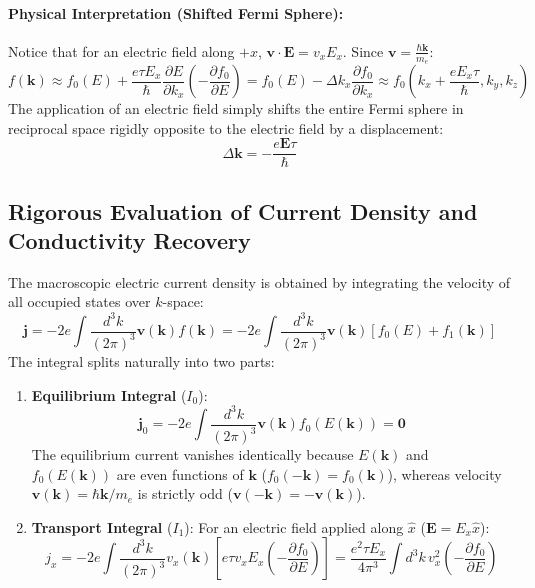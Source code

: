 \documentclass[11pt,a4paper]{article}
\newcommand{\vb}[1]{\mathbf{#1}}
\begin{document}
\paragraph{Physical Interpretation (Shifted Fermi Sphere):}
Notice that for an electric field along $+x$, $\vb{v}\cdot\vb{E} = v_x E_x$. Since $\vb{v} = \frac{\hbar\vb{k}}{m_e}$:
\begin{equation}
f(\vb{k}) \approx f_0(E) + \frac{e\tau E_x}{\hbar}\frac{\partial E}{\partial k_x}\left(-\frac{\partial f_0}{\partial E}\right) = f_0(E) - \Delta k_x \frac{\partial f_0}{\partial k_x} \approx f_0\left(k_x + \frac{e E_x \tau}{\hbar}, k_y, k_z\right)
\end{equation}
The application of an electric field simply shifts the entire Fermi sphere in reciprocal space rigidly opposite to the electric field by a displacement:
\begin{equation}
\boxed{\Delta\vb{k} = -\frac{e\vb{E}\tau}{\hbar}}
\label{eq:k_shift}
\end{equation}

\subsection{Rigorous Evaluation of Current Density and Conductivity Recovery}
The macroscopic electric current density is obtained by integrating the velocity of all occupied states over $k$-space:
\begin{equation}
\vb{j} = -2e\int \frac{d^3k}{(2\pi)^3}\vb{v}(\vb{k}) f(\vb{k}) = -2e\int \frac{d^3k}{(2\pi)^3}\vb{v}(\vb{k})\left[ f_0(E) + f_1(\vb{k}) \right]
\label{eq:j_integral_split}
\end{equation}
The integral splits naturally into two parts:
\begin{enumerate}
    \item \textbf{Equilibrium Integral} ($I_0$):
    \begin{equation}
    \vb{j}_0 = -2e\int \frac{d^3k}{(2\pi)^3}\vb{v}(\vb{k})f_0(E(\vb{k})) = \vb{0}
    \end{equation}
    The equilibrium current vanishes identically because $E(\vb{k})$ and $f_0(E(\vb{k}))$ are even functions of $\vb{k}$ ($f_0(-\vb{k}) = f_0(\vb{k})$), whereas velocity $\vb{v}(\vb{k}) = \hbar\vb{k}/m_e$ is strictly odd ($\vb{v}(-\vb{k}) = -\vb{v}(\vb{k})$).
    \item \textbf{Transport Integral} ($I_1$):
    For an electric field applied along $\hat{x}$ ($\vb{E} = E_x\hat{x}$):
    \begin{equation}
    j_x = -2e\int \frac{d^3k}{(2\pi)^3}v_x(\vb{k})\left[ e\tau v_x E_x \left(-\frac{\partial f_0}{\partial E}\right) \right] = \frac{e^2\tau E_x}{4\pi^3}\int d^3k\, v_x^2 \left(-\frac{\partial f_0}{\partial E}\right)
    \label{eq:jx_transport_integral}
    \end{equation}
\end{enumerate}
\end{document}
